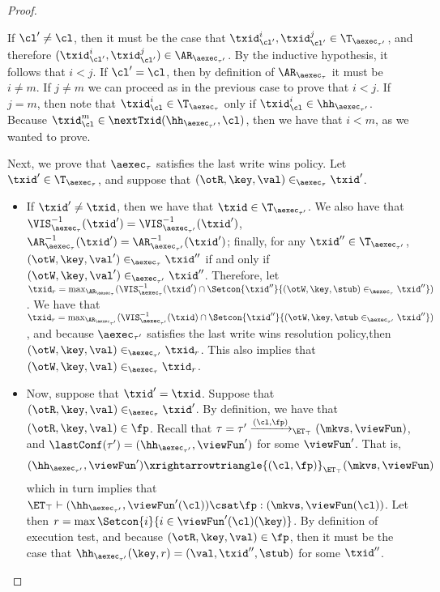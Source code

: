 \begin{proof}
\begin{itemize}
\begin{itemize}
If $\cl' \neq \cl$, then it must be the case that $\txid_{\cl'}^{i}, \txid_{\cl'}^{j} \in \T_{\aexec_{\tau'}}$, 
and therefore $(\txid_{\cl'}^{i}, \txid_{\cl'}^{j}) \in \AR_{\aexec_{\tau'}}$. By the inductive hypothesis, 
it follows that $i < j$. If $\cl' = \cl$, then by definition of $\AR_{\aexec_{\tau}}$ it must be  $i \neq m$. 
If $j \neq m$ we can proceed as in the previous case to prove that $i < j$. If $j = m$, then 
note that $\txid_{\cl}^{i} \in \T_{\aexec_{\tau}}$ only if $\txid_{\cl}^{i} \in \hh_{\aexec_{\tau'}}$. 
Because $\txid_{\cl}^{m} \in \nextTxid(\hh_{\aexec_{\tau'}}, \cl)$, then we have that $i < m$, 
as we wanted to prove.
\end{itemize}

Next, we prove that $\aexec_{\tau}$ satisfies the last write wins policy. 
Let $\txid' \in \T_{\aexec_{\tau}}$, and suppose that $(\otR, \key, \val) \in_{\aexec_{\tau}} \txid'$. 
\begin{itemize} 
\item If $\txid' \neq \txid$, then we have that $\txid \in \T_{\aexec_{\tau'}}$. We also have that 
$\VIS^{-1}_{\aexec_{\tau}}(\txid') = \VIS^{-1}_{\aexec_{\tau'}}(\txid')$, $\AR^{-1}_{\aexec_{\tau}}(\txid') 
= \AR^{-1}_{\aexec_{\tau'}}(\txid')$; finally, for any $\txid'' \in \T_{\aexec_{\tau'}}$, 
$(\otW, \key, \val') \in_{\aexec_{\tau}} \txid''$ if and only if $(\otW, \key, \val') \in_{\aexec_{\tau'}} 
\txid''$. Therefore, let $\txid_{r} = \max_{\AR_{\aexec_{\tau}}}(\VIS^{-1}_{\aexec_{\tau}}(\txid') \cap 
\Setcon{\txid'' }{ (\otW, \key, \stub) \in_{\aexec_{\tau}} \txid''})$. We have that $\txid_{r} = \max_{\AR_{\aexec_{\tau'}}}(\VIS^{-1}_{\aexec_{\tau'}}(\txid) 
\cap \Setcon{ \txid'' }{ (\otW, \key, \stub \in_{\aexec_{\tau'}} \txid''})$, and because $\aexec_{\tau'}$ satisfies the last write 
wins resolution policy,then $(\otW, \key, \val) \in_{\aexec_{\tau'}} \txid_{r}$. This also implies that 
$(\otW, \key, \val) \in_{\aexec_{\tau}} \txid_{r}$. 

\item Now, suppose that $\txid' = \txid$. Suppose that $(\otR, \key, \val) \in_{\aexec_{\tau}} \txid'$. 
By definition, we have that $(\otR, \key, \val) \in \fp$. Recall that $\tau = \tau' \xrightarrow{(\cl, \fp)}_{\ET_{\top}} (\mkvs, \viewFun)$, 
and $\lastConf(\tau') = (\hh_{\aexec_{\tau'}}, \viewFun')$ for some $\viewFun'$. 
That is, 
\[
    (\hh_{\aexec_{\tau'}}, \viewFun') \xrightarrowtriangle{(\cl, \fp)}_{\ET_{\top}} (\mkvs, \viewFun)
\]
which in turn implies that $\ET_{\top} \vdash (\hh_{\aexec_{\tau'}}, \viewFun'(\cl)) \csat \fp : (\mkvs,\viewFun(\cl) )$. 
Let then $r = \max\Setcon{i}{  i \in \viewFun'(\cl)(\key)}$. 
By definition of execution test, and because $(\otR, \key, \val) \in \fp$, then it must be the case that 
$\hh_{\aexec_{\tau'}}(\key, r) = (\val, \txid'', \stub)$ for some $\txid''$. 


\end{itemize}
\end{itemize}
\end{proof}
